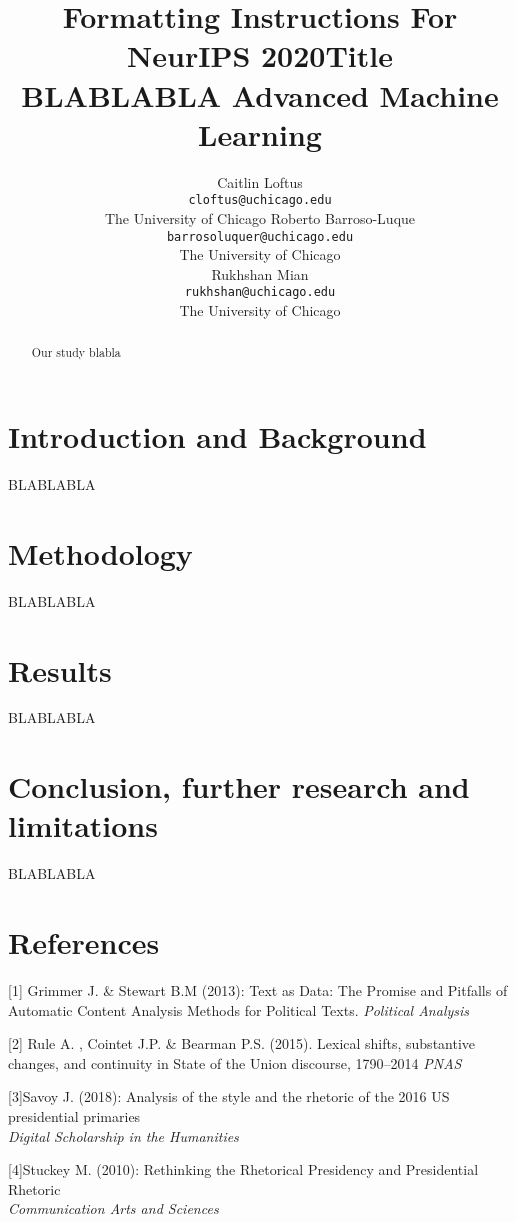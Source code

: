 \documentclass{article}
\title{Formatting Instructions For NeurIPS 2020}
\title{Title\\ BLABLABLA
	\large Advanced Machine Learning}
\author{Caitlin Loftus \\
	\texttt{cloftus@uchicago.edu}  \\
	The University of Chicago
	\AND
	Roberto Barroso-Luque\\
	\texttt{barrosoluquer@uchicago.edu} \\
    The University of Chicago\\
	\AND
	Rukhshan Mian\\
	\texttt{rukhshan@uchicago.edu} \\
	The University of Chicago\\}
\begin{document}
\maketitle

\begin{abstract}{
		Our study blabla
	}
\end{abstract}

\newpage
\section{Introduction and Background}{
BLABLABLA

}
\newpage

\section{Methodology}{BLABLABLA
}
\newpage

\section{Results}{	BLABLABLA
}
\newpage
\section{Conclusion, further research and limitations}{
BLABLABLA
}

\section{References}\label{sec_ref}

[1] Grimmer J. \& Stewart B.M (2013): Text as Data: The Promise and Pitfalls of Automatic Content Analysis Methods for Political Texts. 
{\it Political Analysis}

[2] Rule A. , Cointet J.P. \& Bearman P.S. (2015). Lexical shifts, substantive changes, and continuity in State of the Union discourse, 1790–2014 
{\it PNAS}

[3]Savoy J. (2018): Analysis of the style and the rhetoric of the 2016 US presidential primaries \\ 
{\it Digital Scholarship in the Humanities}

[4]Stuckey M. (2010): Rethinking the Rhetorical Presidency and Presidential Rhetoric \\ 
{\it Communication Arts and Sciences}
\newpage
\pagebreak
\end{document}
